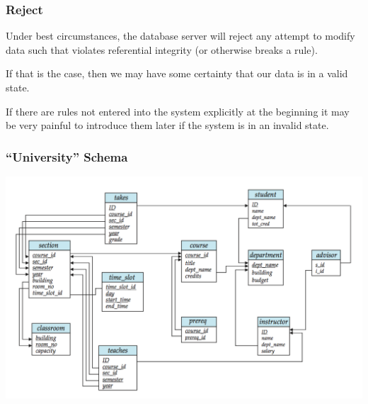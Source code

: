 \begin{frame}
\frametitle{Reject}

Under best circumstances, the database server will reject any attempt to modify data such that violates referential integrity (or otherwise breaks a rule). 

If that is the case, then we may have some certainty that our data is in a valid state. 

If there are rules not entered into the system explicitly at the beginning it may be very painful to introduce them later if the system is in an invalid state. 


\end{frame}



\begin{frame}
\frametitle{``University'' Schema}

\begin{center}
	\includegraphics[width=\textwidth]{images/schemadiagram.png}
\end{center}


\end{frame}






